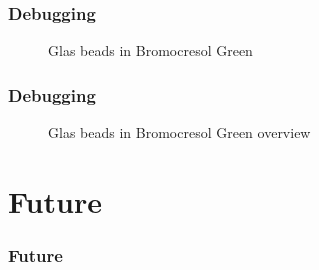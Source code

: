 \begin{frame}
	\frametitle{Debugging}
	\vspace{1cm} %
	\begin{figure}
	  \centering
	  \begin{minipage}[t]{0.3\textwidth}
	  \end{minipage}
	  \begin{minipage}[t]{0.3\textwidth}
	  \end{minipage}
	  \begin{minipage}[t]{0.3\textwidth}
	  \end{minipage}
	  
	  \caption{Glas beads in Bromocresol Green}
	\end{figure}
 
\end{frame}


\begin{frame}
	\frametitle{Debugging}
	\begin{figure}
	  \centering
	  \caption{Glas beads in Bromocresol Green overview}
	\end{figure}
 
\end{frame}

\section{Future}
\begin{frame}
	\frametitle{Future}
	\vspace{1cm} %
	\begin{figure}
	  \centering
	\end{figure}

\end{frame}




